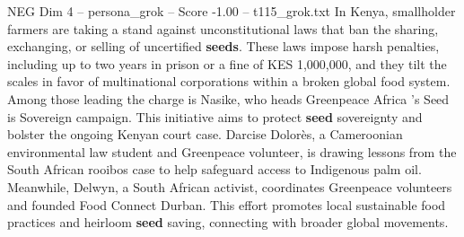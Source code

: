 \begin{textsample}{NEG Dim 4 – persona\_grok – Score -1.00 – t115\_grok.txt}  \label{ex:f4_neg_025}
In Kenya, smallholder farmers are taking a stand against unconstitutional laws that ban the sharing, exchanging, or selling of uncertified \textbf{seeds}.
These laws impose harsh penalties, including up to two years in prison or a fine of KES 1,000,000, and they tilt the scales in favor of multinational corporations within a broken global food system.
Among those leading the charge is Nasike, who heads Greenpeace Africa 's Seed is Sovereign campaign.
This initiative aims to protect \textbf{seed} sovereignty and bolster the ongoing Kenyan court case.
Darcise Dolorès, a Cameroonian environmental law student and Greenpeace volunteer, is drawing lessons from the South African rooibos case to help safeguard access to Indigenous palm oil.
Meanwhile, Delwyn, a South African activist, coordinates Greenpeace volunteers and founded Food Connect Durban.
This effort promotes local sustainable food practices and heirloom \textbf{seed} saving, connecting with broader global movements.

\end{textsample}
